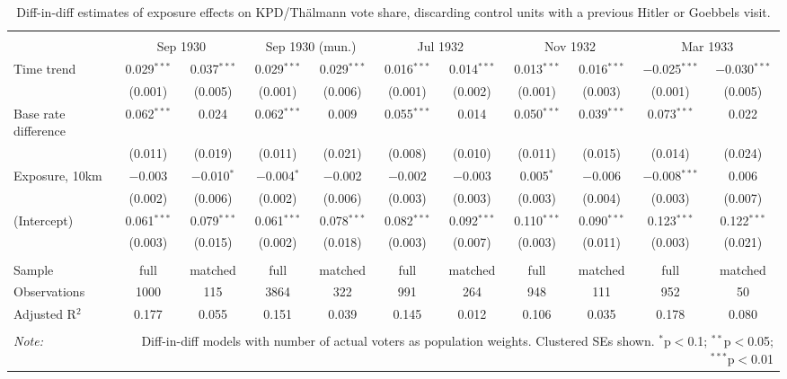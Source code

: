 
\begin{table}[!htbp] \centering 
  \caption{Diff-in-diff estimates of exposure effects on KPD/Thälmann vote share, discarding control units with a previous Hitler or Goebbels visit.\vspace{-.25cm}} 
  \label{tab:kpd-voteshare-dd-control-no-prev-visit} 
\scriptsize 
\begin{tabular}{@{\extracolsep{5pt}}lcccccccccc} 
\\[-1.8ex]\hline 
\hline \\[-1.8ex] 
 & \multicolumn{2}{c}{Sep 1930} & \multicolumn{2}{c}{Sep 1930 (mun.)} & \multicolumn{2}{c}{Jul 1932} & \multicolumn{2}{c}{Nov 1932} & \multicolumn{2}{c}{Mar 1933} \\ 
 \cmidrule(r){2-3}\cmidrule(r){4-5}\cmidrule(r){6-7}\cmidrule(r){8-9}\cmidrule(r){10-11}Time trend & 0.029$^{***}$ & 0.037$^{***}$ & 0.029$^{***}$ & 0.029$^{***}$ & 0.016$^{***}$ & 0.014$^{***}$ & 0.013$^{***}$ & 0.016$^{***}$ & $-$0.025$^{***}$ & $-$0.030$^{***}$ \\ 
  & (0.001) & (0.005) & (0.001) & (0.006) & (0.001) & (0.002) & (0.001) & (0.003) & (0.001) & (0.005) \\ 
  Base rate difference & 0.062$^{***}$ & 0.024 & 0.062$^{***}$ & 0.009 & 0.055$^{***}$ & 0.014 & 0.050$^{***}$ & 0.039$^{***}$ & 0.073$^{***}$ & 0.022 \\ 
  & (0.011) & (0.019) & (0.011) & (0.021) & (0.008) & (0.010) & (0.011) & (0.015) & (0.014) & (0.024) \\ 
  Exposure, 10km & $-$0.003 & $-$0.010$^{*}$ & $-$0.004$^{*}$ & $-$0.002 & $-$0.002 & $-$0.003 & 0.005$^{*}$ & $-$0.006 & $-$0.008$^{***}$ & 0.006 \\ 
  & (0.002) & (0.006) & (0.002) & (0.006) & (0.003) & (0.003) & (0.003) & (0.004) & (0.003) & (0.007) \\ 
  (Intercept) & 0.061$^{***}$ & 0.079$^{***}$ & 0.061$^{***}$ & 0.078$^{***}$ & 0.082$^{***}$ & 0.092$^{***}$ & 0.110$^{***}$ & 0.090$^{***}$ & 0.123$^{***}$ & 0.122$^{***}$ \\ 
  & (0.003) & (0.015) & (0.002) & (0.018) & (0.003) & (0.007) & (0.003) & (0.011) & (0.003) & (0.021) \\ 
 \hline \\[-1.8ex] 
Sample & full & matched & full & matched & full & matched & full & matched & full & matched \\ 
Observations & 1000 & 115 & 3864 & 322 & 991 & 264 & 948 & 111 & 952 & 50 \\ 
Adjusted R$^{2}$ & 0.177 & 0.055 & 0.151 & 0.039 & 0.145 & 0.012 & 0.106 & 0.035 & 0.178 & 0.080 \\ 
\hline 
\hline \\[-1.8ex] 
\textit{Note:}  & \multicolumn{10}{r}{Diff-in-diff models with number of actual voters as population weights. Clustered SEs shown. $^{*}$p$<$0.1; $^{**}$p$<$0.05; $^{***}$p$<$0.01} \\ 
\end{tabular} 
\end{table} 
